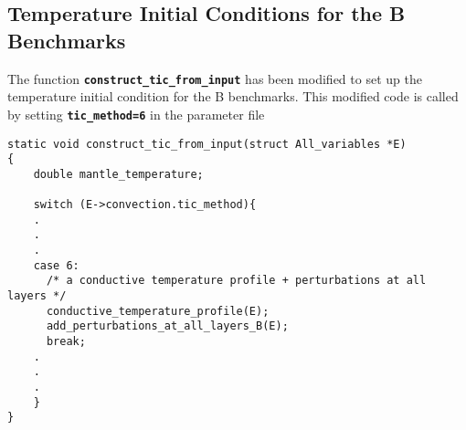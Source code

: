 \documentclass[10pt]{article}
\begin{document}
\subsection*{Temperature Initial Conditions for the B Benchmarks}
The function \textbf{\texttt{construct\_tic\_from\_input}} has been modified to set up the temperature initial 
condition for the B benchmarks. This modified code is called by setting \textbf{\texttt{tic\_method=6}} in the 
parameter file

\begin{verbatim}
static void construct_tic_from_input(struct All_variables *E)
{
    double mantle_temperature;

    switch (E->convection.tic_method){
    .
    .
    .
    case 6:
      /* a conductive temperature profile + perturbations at all layers */
      conductive_temperature_profile(E);
      add_perturbations_at_all_layers_B(E);
      break;
    .
    .
    .
    }
}
\end{verbatim}
\end{document}
